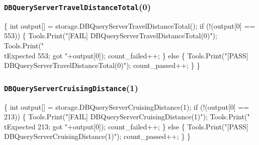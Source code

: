 \documentclass{article}
\def\nwendcode{\endtrivlist \endgroup}
\let\nwdocspar=\par
\begin{document}
\subsubsection{{\tt{}DBQueryServerTravelDistanceTotal}(0)}
\nwenddocs{}\endmoddef{}
\{
  int output[] = storage.DBQueryServerTravelDistanceTotal();
  if (!(output[0] == 553)) \{
    Tools.Print("[FAIL] DBQueryServerTravelDistanceTotal(0)");
    Tools.Print("\\tExpected 553; got "+output[0]);
    count_failed++;
  \} else \{
    Tools.Print("[PASS] DBQueryServerTravelDistanceTotal(0)");
    count_passed++;
  \}
\}
\nwendcode{}\nwdocspar
\subsubsection{{\tt{}DBQueryServerCruisingDistance}(1)}
\nwenddocs{}\endmoddef{}
\{
  int output[] = storage.DBQueryServerCruisingDistance(1);
  if (!(output[0] == 213)) \{
    Tools.Print("[FAIL] DBQueryServerCruisingDistance(1)");
    Tools.Print("\\tExpected 213; got "+output[0]);
    count_failed++;
  \} else \{
    Tools.Print("[PASS] DBQueryServerCruisingDistance(1)");
    count_passed++;
  \}
\}
\nwendcode{}\nwdocspar
\end{document}
